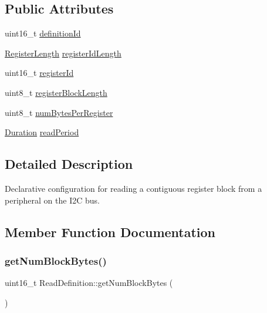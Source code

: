 \subsection*{Public Attributes}
\begin{DoxyCompactItemize}
\item 
uint16\+\_\+t \mbox{\hyperlink{struct_read_definition_ad38fa1092da3ab3fbc4543b306392b0e}{definition\+Id}}
\item 
\mbox{\hyperlink{_i2_c_peripheral_8h_ae0efcb4a72d88c76f03e57ed26b03383}{Register\+Length}} \mbox{\hyperlink{struct_read_definition_a842c09b580d962b7c8b8ce979c25c0e7}{register\+Id\+Length}}
\item 
uint16\+\_\+t \mbox{\hyperlink{struct_read_definition_af46d93354ce1dc2f413439b41b46eaa1}{register\+Id}}
\item 
uint8\+\_\+t \mbox{\hyperlink{struct_read_definition_a0b480fa0fee8d4651383ec6cf48bd7f0}{register\+Block\+Length}}
\item 
uint8\+\_\+t \mbox{\hyperlink{struct_read_definition_a3c13b2c7c3fb73632c856480621d32d6}{num\+Bytes\+Per\+Register}}
\item 
\mbox{\hyperlink{_scheduler_8h_aca1fa1a7edde6bf9e22c7617400fad31}{Duration}} \mbox{\hyperlink{struct_read_definition_aff14d6c02cce669e70bf4e7f45fb6ae0}{read\+Period}}
\end{DoxyCompactItemize}


\subsection{Detailed Description}
Declarative configuration for reading a contiguous register block from a peripheral on the I2C bus. 

\subsection{Member Function Documentation}
\mbox{\label{struct_read_definition_a0cd8f09fd884f9d1f3c8638fafd47c82}} 
\subsubsection{\texorpdfstring{get\+Num\+Block\+Bytes()}{getNumBlockBytes()}}
{\footnotesize\ttfamily uint16\+\_\+t Read\+Definition\+::get\+Num\+Block\+Bytes (\begin{DoxyParamCaption}{ }\end{DoxyParamCaption})}



